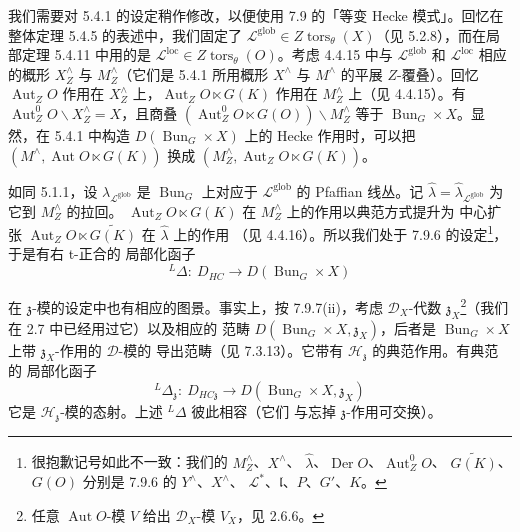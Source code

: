 我们需要对 5.4.1 的设定稍作修改，以便使用 7.9 的「等变 Hecke 模式」。回忆在
整体定理 5.4.5 的表述中，我们固定了
$\mathcal{L}^{\mathrm{glob}}\in Z\operatorname{tors}_{\theta}(X)$（见 5.2.8），而在局部定理
5.4.11 中用的是 $\mathcal{L}^{\mathrm{loc}}\in Z\operatorname{tors}_{\theta}(O)$。考虑
4.4.15 中与 $\mathcal{L}^{\mathrm{glob}}$ 和 $\mathcal{L}^{\mathrm{loc}}$ 相应的概形
$X^{\wedge}_{Z}$ 与 $M^{\wedge}_{Z}$（它们是 5.4.1 所用概形 $X^{\wedge}$ 与
$M^{\wedge}$ 的平展 $Z$-覆叠）。回忆 $\operatorname{Aut}_ZO$ 作用在
$X^{\wedge}_{Z}$ 上，$\operatorname{Aut}_ZO\ltimes G(K)$ 作用在
$M^{\wedge}_{Z}$ 上（见 4.4.15）。有
$\operatorname{Aut}^{0}_{Z}O\backslash X^{\wedge}_{Z}=X$，且商叠
$(\operatorname{Aut}^{0}_{Z}O\ltimes G(O))\backslash M^{\wedge}_{Z}$ 等于
$\operatorname{Bun}_G\times X$。显然，在 5.4.1 中构造
$D(\operatorname{Bun}_G\times X)$ 上的 Hecke 作用时，可以把
$(M^{\wedge},\operatorname{Aut}O\ltimes G(K))$ 换成
$(M^{\wedge}_{Z},\operatorname{Aut}_ZO\ltimes G(K))$。

如同 5.1.1，设 $\lambda_{\mathcal{L}^{\mathrm{glob}}}$ 是 $\operatorname{Bun}_G$ 上对应于
$\mathcal{L}^{\mathrm{glob}}$ 的 Pfaffian 线丛。记
$\hat{\lambda}=\hat{\lambda}_{\mathcal{L}^{\mathrm{glob}}}$ 为它到 $M^{\wedge}_{Z}$ 的拉回。
$\operatorname{Aut}_ZO\ltimes G(K)$ 在 $M^{\wedge}_{Z}$ 上的作用以典范方式提升为
中心扩张 $\operatorname{Aut}_ZO\ltimes\widetilde{G(K)}$ 在 $\hat{\lambda}$ 上的作用
（见 4.4.16）。所以我们处于
7.9.6 的设定\footnote{很抱歉记号如此不一致：我们的 $M^{\wedge}_{Z}$、$X^{\wedge}$、
$\hat{\lambda}$、$\operatorname{Der}O$、$\operatorname{Aut}^{0}_{Z}O$、
$\widetilde{G(K)}$、$G(O)$ 分别是 7.9.6 的 $Y^{\wedge}$、$X^{\wedge}$、
$\mathcal{L}^{*}$、$\mathfrak{l}$、$P$、$G'$、$K$。}，于是有右 t-正合的
局部化函子
\[
{}^{L}\Delta:\ D_{HC}\to D(\operatorname{Bun}_G\times X)
\]

在 $\mathfrak{z}$-模的设定中也有相应的图景。事实上，按 7.9.7(ii)，考虑
$\mathcal{D}_X$-代数 $\mathfrak{z}_X$\footnote{任意 $\operatorname{Aut}O$-模 $V$
给出 $\mathcal{D}_X$-模 $V_X$，见 2.6.6。}（我们在 2.7 中已经用过它）以及相应的
范畴 $D(\operatorname{Bun}_G\times X,\mathfrak{z}_X)$，后者是
$\operatorname{Bun}_G\times X$ 上带 $\mathfrak{z}_X$-作用的 $\mathcal{D}$-模的
导出范畴（见 7.3.13）。它带有 $\mathcal{H}_{\mathfrak{z}}$ 的典范作用。有典范的
局部化函子
\[
{}^{L}\Delta_{\mathfrak{z}}:\ D_{HC\mathfrak{z}}\to
D(\operatorname{Bun}_G\times X,\mathfrak{z}_X)
\]
它是 $\mathcal{H}_{\mathfrak{z}}$-模的态射。上述 ${}^{L}\Delta$ 彼此相容（它们
与忘掉 $\mathfrak{z}$-作用可交换）。

